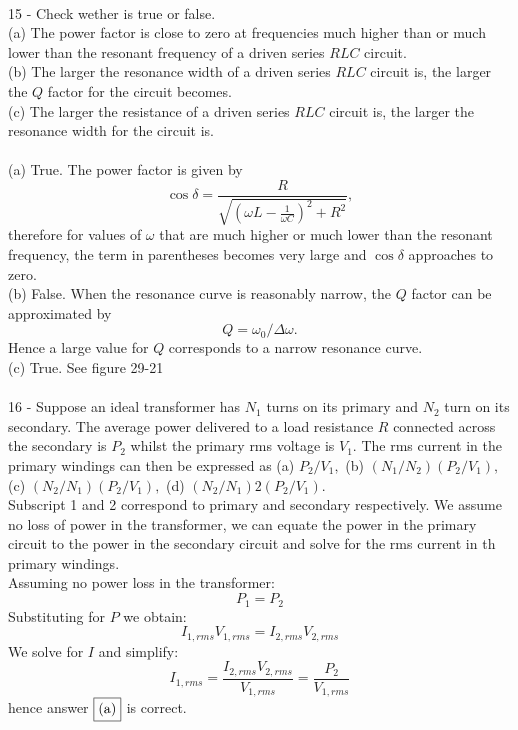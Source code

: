 \documentclass{report}
\begin{document}
\paragraph{}
15 - Check wether is true or false.\\
(a) The power factor is close to zero at frequencies much higher than or much lower than the resonant frequency of a driven series $RLC$ circuit.\\
(b) The larger the resonance width of a driven series $RLC$ circuit is, the larger the $Q$ factor for the circuit becomes.\\
(c) The larger the resistance of a driven series $RLC$ circuit is, the larger the resonance width for the circuit is.\\
\\
(a) True. The power factor is given by
$$\cos \delta = \frac{R}{\sqrt{\left( \omega L - \frac{1}{\omega C}\right)^2 + R^2}},$$
therefore for values of $\omega$ that are much higher or much lower than the resonant frequency, the term in parentheses becomes very large and $\cos \delta$ approaches to zero.\\
(b) False. When the resonance curve is reasonably narrow, the $Q$ factor can be approximated by
$$Q = \omega_0 / \Delta \omega.$$
Hence a large value for $Q$ corresponds to a narrow resonance curve.\\
(c) True. See figure 29-21

\paragraph{}
16 - Suppose an ideal transformer has $N_1$ turns on its primary and $N_2$ turn on its secondary. The average power delivered to a load resistance $R$ connected across the secondary is $P_2$ whilst the primary rms voltage is $V_1$. The rms current in the primary windings can then be expressed as (a) $P_2 / V_1,$ (b) $(N_1 / N_2)(P_2 / V_1),$ (c) $(N_2 / N_1)(P_2 / V_1),$ (d) $(N_2 / N_1)2(P_2 / V_1).$\\
Subscript 1 and 2 correspond to primary and secondary respectively. We assume no loss of power in the transformer, we can equate the power in the primary circuit to the power in the secondary circuit and solve for the rms current in th primary windings.\\
Assuming no power loss in the transformer:
$$P_1 = P_2$$
Substituting for $P$ we obtain:
$$I_{1,rms}V_{1,rms} = I_{2,rms}V_{2,rms}$$
We solve for $I$ and simplify:
$$I_{1,rms} = \frac{I_{2,rms}V_{2,rms}}{V_{1,rms}} = \frac{P_2}{V_{1,rms}}$$
hence answer $\fbox{(a)}$ is correct.
\end{document}
